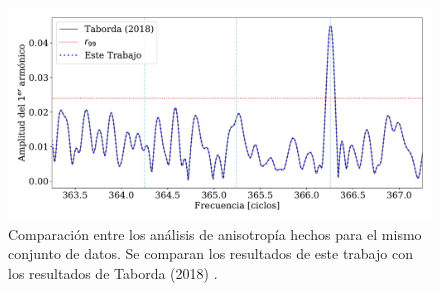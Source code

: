       \begin{figure}[H]
        \centering
        \includegraphics[width=0.9\linewidth]{sin_pesos_referencia_8_EeV.pdf}
        \caption{Comparación entre los análisis de anisotropía hechos para el mismo conjunto de datos. Se comparan los resultados de este trabajo con los resultados de Taborda (2018) \cite{taborda}.}
        \label{fig:sin_pesos_referencia}
      \end{figure}
